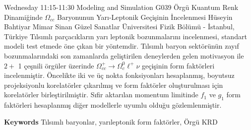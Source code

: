 
    \begin{abstract_basarim}
    {Wednesday 11:15-11:30}
    {Modeling and Simulation}
    {G039}
    {Örgü Kuantum Renk Dinamiğinde $\Omega_{c c}$ Baryonunun Yarı-Leptonik Geçişinin İncelenmesi}
    {%
    Hüseyin Bahtiyar}
    {%
    }
    {%
    Mimar Sinan Güzel Sanatlar Üniversitesi Fizik Bölümü - İstanbul, Türkiye}
    Tılsımlı parçacıkların yarı leptonik bozunmalarını incelenmesi, standart modeli test etmede öne çıkan bir yöntemdir. Tılsımlı baryon sektörünün zayıf bozunmalarındaki son zamanlarda geliştirilen deneylerden gelen motivasyon ile $2+$ 1 çeşnili örgüler üzerinde $\Omega_{c c}^{+} \rightarrow \Omega_{c}^{0} \ell^{+} \nu$ geçişinin form faktörleri incelenmiştir. Öncelikte iki ve üç nokta fonksiyonları hesaplanmış, boyutsuz projeksiyonlu korelatörler çıkarılmış ve form faktörler oluşturulması için korelatörler birleştirilmiştir. Sıfir aktarılan momentum limitinde $f_{1}$ ve $g_{1}$ form faktörleri hesaplanmış diğer modellerle uyumlu olduğu gözlemlenmiştir. 
    
        \textbf{Keywords} \newline{}Tılsımlı baryonlar, yarıleptonik form faktörler, Örgü KRD
    \end{abstract_basarim}
    